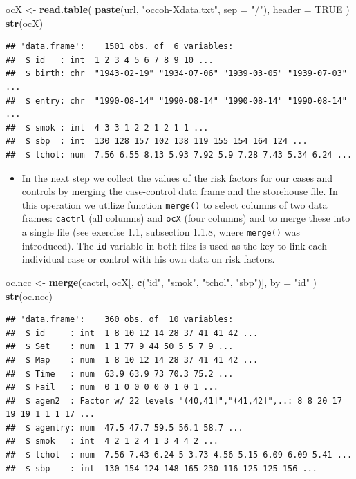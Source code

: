 \documentclass[
]{book}
\newenvironment{Shaded}{\begin{snugshade}}{\end{snugshade}}
\newcommand{\AttributeTok}[1]{\textcolor[rgb]{0.13,0.29,0.53}{#1}}
\newcommand{\ConstantTok}[1]{\textcolor[rgb]{0.56,0.35,0.01}{#1}}
\newcommand{\FunctionTok}[1]{\textcolor[rgb]{0.13,0.29,0.53}{\textbf{#1}}}
\newcommand{\NormalTok}[1]{#1}
\newcommand{\OtherTok}[1]{\textcolor[rgb]{0.56,0.35,0.01}{#1}}
\newcommand{\StringTok}[1]{\textcolor[rgb]{0.31,0.60,0.02}{#1}}
\providecommand{\tightlist}{%
  \setlength{\itemsep}{0pt}\setlength{\parskip}{0pt}}
\begin{document}
\begin{Shaded}
\begin{Highlighting}[]
\NormalTok{ocX }\OtherTok{\textless{}{-}} 
  \FunctionTok{read.table}\NormalTok{(}
    \FunctionTok{paste}\NormalTok{(url, }\StringTok{"occoh{-}Xdata.txt"}\NormalTok{, }\AttributeTok{sep =} \StringTok{"/"}\NormalTok{), }\AttributeTok{header =} \ConstantTok{TRUE}
\NormalTok{  )}
\FunctionTok{str}\NormalTok{(ocX)}
\end{Highlighting}
\end{Shaded}

\begin{verbatim}
## 'data.frame':    1501 obs. of  6 variables:
##  $ id   : int  1 2 3 4 5 6 7 8 9 10 ...
##  $ birth: chr  "1943-02-19" "1934-07-06" "1939-03-05" "1939-07-03" ...
##  $ entry: chr  "1990-08-14" "1990-08-14" "1990-08-14" "1990-08-14" ...
##  $ smok : int  4 3 3 1 2 2 1 2 1 1 ...
##  $ sbp  : int  130 128 157 102 138 119 155 154 164 124 ...
##  $ tchol: num  7.56 6.55 8.13 5.93 7.92 5.9 7.28 7.43 5.34 6.24 ...
\end{verbatim}

\begin{itemize}
\tightlist
\item
  In the next step we collect the values of the risk factors
  for our cases and controls by merging the case-control data frame and
  the storehouse file.
  In this operation we utilize function \texttt{merge()} to
  select columns of two data frames: \texttt{cactrl}
  (all columns) and \texttt{ocX} (four columns) and to merge
  these into a single file (see exercise 1.1, subsection 1.1.8, where
  \texttt{merge()} was introduced).
  The \texttt{id} variable in both files is used as the key to link each
  individual case or control with his own data on risk factors.
\end{itemize}

\begin{Shaded}
\begin{Highlighting}[]
\NormalTok{oc.ncc }\OtherTok{\textless{}{-}} \FunctionTok{merge}\NormalTok{(cactrl, ocX[, }\FunctionTok{c}\NormalTok{(}\StringTok{"id"}\NormalTok{, }\StringTok{"smok"}\NormalTok{, }\StringTok{"tchol"}\NormalTok{, }\StringTok{"sbp"}\NormalTok{)],}
  \AttributeTok{by =} \StringTok{"id"}
\NormalTok{)}
\FunctionTok{str}\NormalTok{(oc.ncc)}
\end{Highlighting}
\end{Shaded}

\begin{verbatim}
## 'data.frame':    360 obs. of  10 variables:
##  $ id     : int  1 8 10 12 14 28 37 41 41 42 ...
##  $ Set    : num  1 1 77 9 44 50 5 5 7 9 ...
##  $ Map    : num  1 8 10 12 14 28 37 41 41 42 ...
##  $ Time   : num  63.9 63.9 73 70.3 75.2 ...
##  $ Fail   : num  0 1 0 0 0 0 0 1 0 1 ...
##  $ agen2  : Factor w/ 22 levels "(40,41]","(41,42]",..: 8 8 20 17 19 19 1 1 1 17 ...
##  $ agentry: num  47.5 47.7 59.5 56.1 58.7 ...
##  $ smok   : int  4 2 1 2 4 1 3 4 4 2 ...
##  $ tchol  : num  7.56 7.43 6.24 5 3.73 4.56 5.15 6.09 6.09 5.41 ...
##  $ sbp    : int  130 154 124 148 165 230 116 125 125 156 ...
\end{verbatim}
\end{document}
